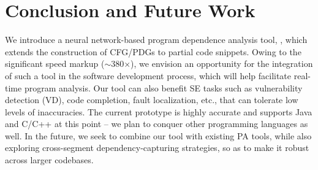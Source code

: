 \section{Conclusion and Future Work}
We introduce a neural network-based program dependence analysis tool, \tool, which extends the construction of CFG/PDGs to partial code snippets. Owing to the significant speed markup ($\sim$380$\times$), we envision an opportunity for the integration of such a tool in the software development process, which will help facilitate real-time program analysis. Our tool can also benefit SE tasks such as vulnerability detection (VD), code completion, fault localization, etc., that can tolerate low levels of inaccuracies. The current prototype is highly accurate and supports Java and C/C++ at this point -- we plan to conquer other programming languages as well. In the future, we seek to combine our tool with existing PA tools, while also exploring cross-segment dependency-capturing strategies, so as to make it robust across larger codebases. 
